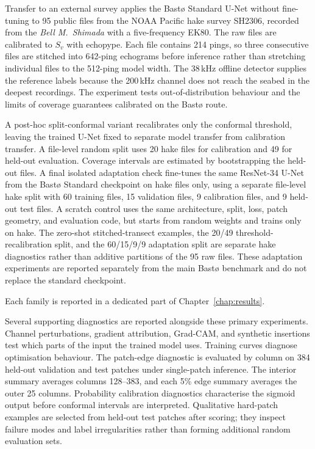 Transfer to an external survey applies the Bast\o{} Standard U-Net without fine-tuning to 95 public files from the NOAA Pacific hake survey SH2306, recorded from the \textit{Bell M.\ Shimada} with a five-frequency EK80. The raw files are calibrated to $S_v$ with echopype. Each file contains 214 pings, so three consecutive files are stitched into 642-ping echograms before inference rather than stretching individual files to the 512-ping model width. The 38\,kHz offline detector supplies the reference labels because the 200\,kHz channel does not reach the seabed in the deepest recordings. The experiment tests out-of-distribution behaviour and the limits of coverage guarantees calibrated on the Bast\o{} route.

A post-hoc split-conformal variant recalibrates only the conformal threshold, leaving the trained U-Net fixed to separate model transfer from calibration transfer. A file-level random split uses 20 hake files for calibration and 49 for held-out evaluation. Coverage intervals are estimated by bootstrapping the held-out files. A final isolated adaptation check fine-tunes the same ResNet-34 U-Net from the Bast\o{} Standard checkpoint on hake files only, using a separate file-level hake split with 60 training files, 15 validation files, 9 calibration files, and 9 held-out test files. A scratch control uses the same architecture, split, loss, patch geometry, and evaluation code, but starts from random weights and trains only on hake. The zero-shot stitched-transect examples, the 20/49 threshold-recalibration split, and the 60/15/9/9 adaptation split are separate hake diagnostics rather than additive partitions of the 95 raw files. These adaptation experiments are reported separately from the main Bast\o{} benchmark and do not replace the standard checkpoint.

Each family is reported in a dedicated part of Chapter~\ref{chap:results}.

Several supporting diagnostics are reported alongside these primary experiments. Channel perturbations, gradient attribution, Grad-CAM, and synthetic insertions test which parts of the input the trained model uses. Training curves diagnose optimisation behaviour. The patch-edge diagnostic is evaluated by column on 384 held-out validation and test patches under single-patch inference. The interior summary averages columns 128--383, and each 5\% edge summary averages the outer 25 columns. Probability calibration diagnostics characterise the sigmoid output before conformal intervals are interpreted. Qualitative hard-patch examples are selected from held-out test patches after scoring; they inspect failure modes and label irregularities rather than forming additional random evaluation sets.

